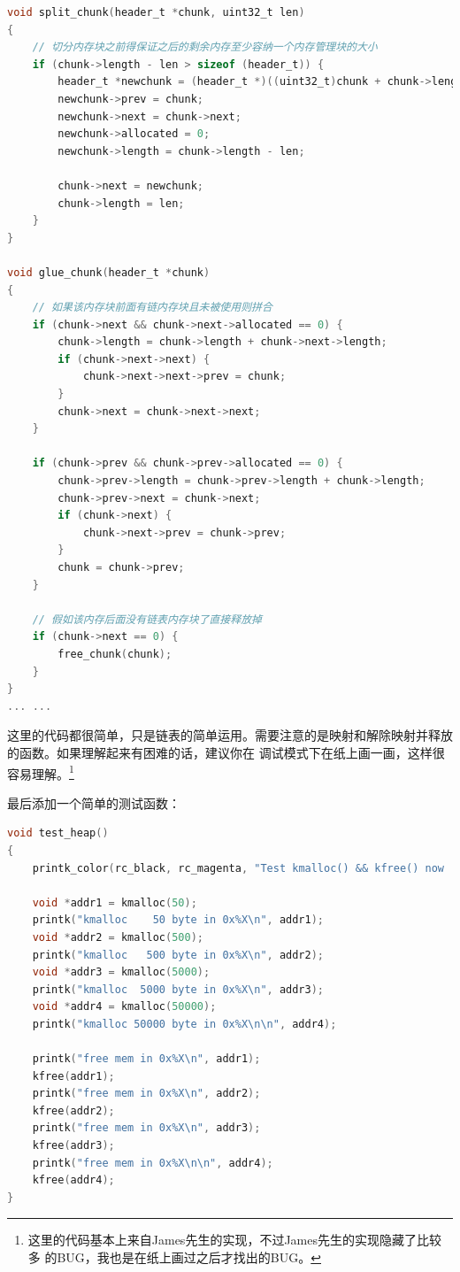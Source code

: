 \begin{lstlisting}[language = C, caption = mm/heap.c]
void split_chunk(header_t *chunk, uint32_t len)
{
	// 切分内存块之前得保证之后的剩余内存至少容纳一个内存管理块的大小
	if (chunk->length - len > sizeof (header_t)) {
		header_t *newchunk = (header_t *)((uint32_t)chunk + chunk->length);
		newchunk->prev = chunk;
		newchunk->next = chunk->next;
		newchunk->allocated = 0;
		newchunk->length = chunk->length - len;

		chunk->next = newchunk;
		chunk->length = len;
	}
}

void glue_chunk(header_t *chunk)
{
	// 如果该内存块前面有链内存块且未被使用则拼合
	if (chunk->next && chunk->next->allocated == 0) {
		chunk->length = chunk->length + chunk->next->length;
		if (chunk->next->next) {
			chunk->next->next->prev = chunk;
		}
		chunk->next = chunk->next->next;
	}

	if (chunk->prev && chunk->prev->allocated == 0) {
		chunk->prev->length = chunk->prev->length + chunk->length;
		chunk->prev->next = chunk->next;
		if (chunk->next) {
			chunk->next->prev = chunk->prev;
		}
		chunk = chunk->prev;
	}

	// 假如该内存后面没有链表内存块了直接释放掉
	if (chunk->next == 0) {
		free_chunk(chunk);
	}
}
... ...
\end{lstlisting}

\par 这里的代码都很简单，只是链表的简单运用。需要注意的是映射和解除映射并释放的函数。如果理解起来有困难的话，建议你在\allowbreak
调试模式下在纸上画一画，这样很容易理解。\footnote{这里的代码基本上来自James先生的实现，不过James先生的实现隐藏了比较多\allowbreak
的BUG，我也是在纸上画过之后才找出的BUG。}

\par 最后添加一个简单的测试函数：

\begin{lstlisting}[language = C, caption = mm/heap.c]
void test_heap()
{
	printk_color(rc_black, rc_magenta, "Test kmalloc() && kfree() now ...\n\n");

	void *addr1 = kmalloc(50);
	printk("kmalloc    50 byte in 0x%X\n", addr1);
	void *addr2 = kmalloc(500);
	printk("kmalloc   500 byte in 0x%X\n", addr2);
	void *addr3 = kmalloc(5000);
	printk("kmalloc  5000 byte in 0x%X\n", addr3);
	void *addr4 = kmalloc(50000);
	printk("kmalloc 50000 byte in 0x%X\n\n", addr4);

	printk("free mem in 0x%X\n", addr1);
	kfree(addr1);
	printk("free mem in 0x%X\n", addr2);
	kfree(addr2);
	printk("free mem in 0x%X\n", addr3);
	kfree(addr3);
	printk("free mem in 0x%X\n\n", addr4);
	kfree(addr4);
}
\end{lstlisting}

